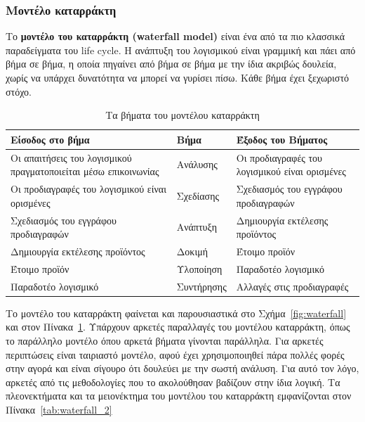 \subsubsection{Μοντέλο καταρράκτη}

Το \textbf{μοντέλο του καταρράκτη (waterfall model)} είναι ένα από τα πιο κλασσικά παραδείγματα του life cycle. Η ανάπτυξη του λογισμικού είναι γραμμική και πάει από βήμα σε βήμα, η οποία πηγαίνει από βήμα σε βήμα με την ίδια ακριβώς δουλεία, χωρίς να υπάρχει δυνατότητα να μπορεί να γυρίσει πίσω. Κάθε βήμα έχει ξεχωριστό στόχο.

\begin{table}[H]
  \centering
  \begin{tabular}{| p{7cm} | p{2cm} | p{6.5cm} |}
    \hline
    \textbf{Είσοδος στο βήμα} & \textbf{Βήμα} & \textbf{Έξοδος του Βήματος} \\
    \hline
    Οι απαιτήσεις του λογισμικού πραγματοποιείται μέσω επικοινωνίας & Ανάλυσης &  Οι προδιαγραφές του λογισμικού είναι ορισμένες \\
    \hline
    Οι προδιαγραφές του λογισμικού είναι ορισμένες & Σχεδίασης & Σχεδιασμός του εγγράφου προδιαγραφών \\
    \hline
    Σχεδιασμός του εγγράφου προδιαγραφών & Ανάπτυξη & Δημιουργία εκτέλεσης προϊόντος \\
    \hline
    Δημιουργία εκτέλεσης προϊόντος & Δοκιμή & Έτοιμο προϊόν \\
    \hline
    Έτοιμο προϊόν & Υλοποίηση & Παραδοτέο λογισμικό \\
    \hline
    Παραδοτέο λογισμικό & Συντήρησης & Αλλαγές στις προδιαγραφές \\
    \hline
  \end{tabular}
  \caption{Τα βήματα του μοντέλου καταρράκτη}
  \label{tab:waterfall_1}
\end{table}

Το μοντέλο του καταρράκτη φαίνεται και παρουσιαστικά στο Σχήμα~\ref{fig:waterfall} και στον Πίνακα~\ref{tab:waterfall_1}. Υπάρχουν αρκετές παραλλαγές του μοντέλου καταρράκτη, όπως το παράλληλο μοντέλο όπου αρκετά βήματα γίνονται παράλληλα. Για αρκετές περιπτώσεις είναι ταιριαστό μοντέλο, αφού έχει χρησιμοποιηθεί πάρα πολλές φορές στην αγορά και είναι σίγουρο ότι δουλεύει με την σωστή ανάλυση. Για αυτό τον λόγο, αρκετές από τις μεθοδολογίες που το ακολούθησαν βαδίζουν στην ίδια λογική. Τα πλεονεκτήματα και τα μειονέκτημα του μοντέλου του καταρράκτη εμφανίζονται στον Πίνακα~\ref{tab:waterfall_2}

